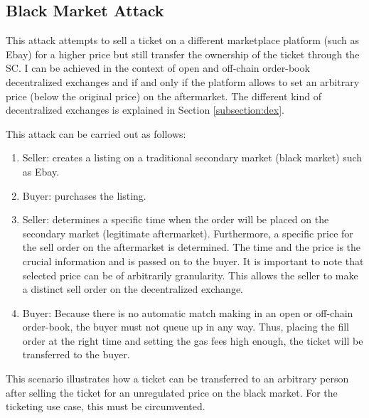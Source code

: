 
\subsection{Black Market Attack}\label{subsection:black-market-attack}
This attack attempts to sell a ticket on a different marketplace platform (such as Ebay) for a higher price but still transfer the ownership of the ticket through the SC. I can be achieved in the context of open and off-chain order-book decentralized exchanges and if and only if the platform allows to set an arbitrary price (below the original price) on the aftermarket. The different kind of decentralized exchanges is explained in Section \ref{subsection:dex}.

This attack can be carried out as follows:

\begin{enumerate}
    \item Seller: creates a listing on a traditional secondary market (black market) such as Ebay.
    \item Buyer: purchases the listing.
    \item Seller: determines a specific time when the order will be placed on the secondary market (legitimate aftermarket). Furthermore, a specific price for the sell order on the aftermarket is determined. The time and the price is the crucial information and is passed on to the buyer. It is important to note that selected price can be of arbitrarily granularity. This allows the seller to make a distinct sell order on the decentralized exchange. 
    \item Buyer: Because there is no automatic match making in an open or off-chain order-book, the buyer must not queue up in any way. Thus, placing the fill order at the right time and setting the gas fees high enough, the ticket will be transferred to the buyer. 
\end{enumerate}

This scenario illustrates how a ticket can be transferred to an arbitrary person after selling the ticket for an unregulated price on the black market. For the ticketing use case, this must be circumvented.  